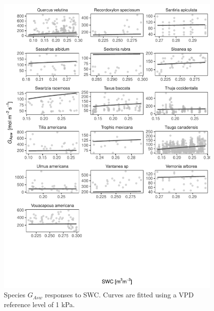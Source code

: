 \documentclass[11pt,twoside]{reedthesis}
\begin{document}
\begin{figure}[H]

{\centering \includegraphics[width=1\linewidth]{figure/appendixD/ggg15} 

}

\caption{Species $G_{Asw}$ responses to SWC. Curves are fitted using a VPD reference level of 1 kPa.}\label{fig:unnamed-chunk-32}
\end{figure}
\end{document}

